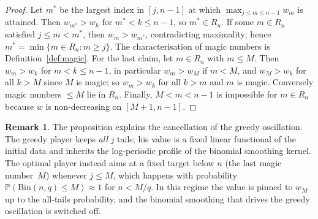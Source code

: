 \documentclass[11pt]{article}
\theoremstyle{definition}
\newtheorem{remark}[theorem]{Remark}
\newcommand{\Bin}{\mathrm{Bin}}
\newcommand{\Prob}{\mathbb{P}}
\begin{document}
\begin{proof}
  Let $m^*$ be the largest index in $[j,n-1]$ at which
  $\max_{j\le m\le n-1}w_m$ is attained.  Then $w_{m^*}>w_k$ for
  $m^*<k\le n-1$, so $m^*\in R_n$.  If some $m\in R_n$ satisfied
  $j\le m<m^*$, then $w_m>w_{m^*}$, contradicting maximality; hence
  $m^*=\min\{m\in R_n: m\ge j\}$.  The characterisation of magic
  numbers is Definition~\ref{def:magic}.  For the last claim, let
  $m\in R_n$ with $m\le M$.  Then $w_m>w_k$ for $m<k\le n-1$, in
  particular $w_m>w_M$ if $m<M$, and $w_M>w_k$ for all $k>M$ since $M$
  is magic; so $w_m>w_k$ for all $k>m$ and $m$ is magic.  Conversely
  magic numbers $\le M$ lie in $R_n$.  Finally, $M<m<n-1$ is
  impossible for $m\in R_n$ because $w$ is non-decreasing on
  $[M+1,n-1]$.
\end{proof}

\begin{remark}
  The proposition explains the cancellation of the greedy
  oscillation.  The greedy player keeps \emph{all} $j$ tails; his
  value is a fixed linear functional of the initial data and inherits
  the log-periodic profile of the binomial smoothing kernel.  The
  optimal player instead aims at a fixed target below $n$ (the last
  magic number~$M$) whenever $j\le M$, which happens with probability
  $\Prob(\Bin(n,q)\le M)\approx1$ for $n<M/q$.  In this regime the
  value is pinned to $w_M$ up to the all-tails probability, and the
  binomial smoothing that drives the greedy oscillation is switched
  off.
\end{remark}
\end{document}

